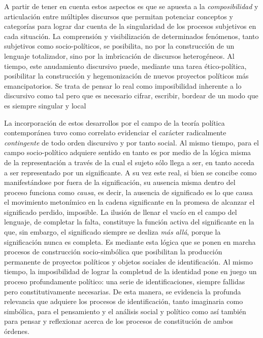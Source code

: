A partir de tener en cuenta estos aspectos es que se apuesta a la \emph{composibilidad} y articulación entre múltiples discursos que permitan potenciar conceptos y categorías para lograr dar cuenta de la singularidad de los procesos subjetivos en cada situación. La comprensión y visibilización de determinados fenómenos, tanto subjetivos como socio-políticos, se posibilita, no por la construcción de un lenguaje totalizador, sino por la imbricación de discursos heterogéneos. Al tiempo, este anudamiento discursivo puede, mediante una tarea ético-política, posibilitar la construcción y hegemonización de nuevos proyectos políticos más emancipatorios. Se trata de pensar lo real como imposibilidad inherente a lo discursivo como tal pero que es necesario cifrar, escribir, bordear de un modo que es siempre singular y local

La incorporación de estos desarrollos por el campo de la teoría política contemporánea tuvo como correlato evidenciar el carácter radicalmente \emph{contingente} de todo orden discursivo y por tanto social. Al mismo tiempo, para el campo socio-político adquiere sentido en tanto es por medio de la lógica misma de la representación a través de la cual el sujeto sólo llega a ser, en tanto acceda a ser representado por un significante. A su vez este real, si bien se concibe como manifestándose por fuera de la significación, su ausencia misma dentro del proceso funciona como \emph{causa}, es decir, la ausencia de significado es lo que causa el movimiento metonímico en la cadena significante en la promesa de alcanzar el significado perdido, imposible. La ilusión de llenar el vacío en el campo del lenguaje, de completar la falta, constituye la función activa del significante en la que, sin embargo, el significado siempre se desliza \emph{más allá}, porque la significación nunca es completa. Es mediante esta lógica que se ponen en marcha procesos de construcción socio-simbólica que posibilitan la producción permanente de proyectos políticos y objetos sociales de identificación. Al mismo tiempo, la imposibilidad de lograr la completud de la identidad pone en juego un proceso profundamente político: una serie de identificaciones, siempre fallidas pero constitutivamente necesarias. De esta manera, se evidencia la profunda relevancia que adquiere los procesos de identificación, tanto imaginaria como simbólica, para el pensamiento y el análisis social y político como así también para pensar y reflexionar acerca de los procesos de constitución de ambos órdenes.

